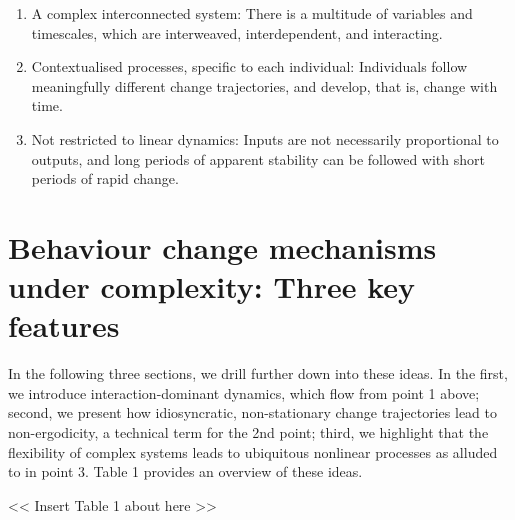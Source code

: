 \documentclass[
  british,
  man,floatsintext]{apa6}
\providecommand{\tightlist}{%
  \setlength{\itemsep}{0pt}\setlength{\parskip}{0pt}}
\begin{document}
\begin{enumerate}
\def\labelenumi{\arabic{enumi}.}
\tightlist
\item
  A complex interconnected system: There is a multitude of variables and timescales, which are interweaved, interdependent, and interacting.
\item
  Contextualised processes, specific to each individual: Individuals follow meaningfully different change trajectories, and develop, that is, change with time.
\item
  Not restricted to linear dynamics: Inputs are not necessarily proportional to outputs, and long periods of apparent stability can be followed with short periods of rapid change.
\end{enumerate}

\hypertarget{behaviour-change-mechanisms-under-complexity-three-key-features}{%
\section{Behaviour change mechanisms under complexity: Three key features}\label{behaviour-change-mechanisms-under-complexity-three-key-features}}

In the following three sections, we drill further down into these ideas. In the first, we introduce interaction-dominant dynamics, which flow from point 1 above; second, we present how idiosyncratic, non-stationary change trajectories lead to non-ergodicity, a technical term for the 2nd point; third, we highlight that the flexibility of complex systems leads to ubiquitous nonlinear processes as alluded to in point 3. Table 1 provides an overview of these ideas.

\textless\textless{} Insert Table 1 about here \textgreater\textgreater{}
\end{document}
